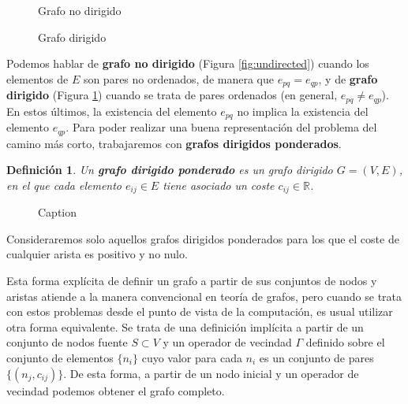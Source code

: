 \documentclass[a4paper,12pt]{article}
\newtheorem{defn}{Definición}
\begin{document}
\begin{figure}[H]
    \centering
    \begin{minipage}{0.47\textwidth}
        \centering
        
        \caption{Grafo no dirigido}
        \label{fig:undirected}
    \end{minipage}
    \begin{minipage}{0.47\textwidth}
        \centering
        
        \caption{Grafo dirigido}
        \label{fig:directed}
    \end{minipage}
\end{figure}

\noindent Podemos hablar de \textbf{grafo no dirigido} (Figura \ref{fig:undirected}) cuando los elementos de $E$ son pares no ordenados, de manera que $e_{pq}=e_{qp}$, y de \textbf{grafo dirigido} (Figura \ref{fig:directed}) cuando se trata de pares ordenados (en general, $e_{pq} \neq e_{qp}$). En estos últimos, la existencia del elemento $e_{pq}$ no implica la existencia del elemento $e_{qp}$. Para poder realizar una buena representación del problema del camino más corto, trabajaremos con \textbf{grafos dirigidos ponderados}.

\begin{defn}
Un \textbf{grafo dirigido ponderado} es un grafo dirigido $G=(V,E)$, en el que cada elemento $e_{ij}\in E$ tiene asociado un coste $c_{ij} \in \mathbb{R}$.
\end{defn}

\begin{figure}
    \centering
    
    \caption{Caption}
    \label{fig:weighted}
\end{figure}

\noindent Consideraremos solo aquellos grafos dirigidos ponderados para los que el coste de cualquier arista es positivo y no nulo.

Esta forma explícita de definir un grafo a partir de sus conjuntos de nodos y aristas atiende a la manera convencional en teoría de grafos, pero cuando se trata con estos problemas desde el punto de vista de la computación, es usual utilizar otra forma equivalente. Se trata de una definición implícita a partir de un conjunto de nodos fuente $S\subset V$ y un operador de vecindad $\Gamma$ definido sobre el conjunto de elementos $\{n_i\}$ cuyo valor para cada $n_i$ es un conjunto de pares $\{(n_j, c_{ij})\}$. De esta forma, a partir de un nodo inicial y un operador de vecindad podemos obtener el grafo completo.
\end{document}
